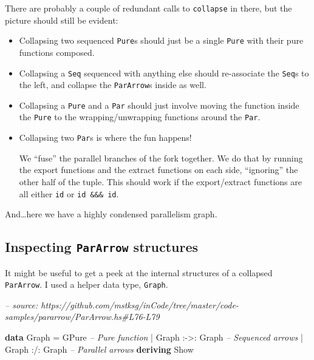 \documentclass[]{article}
\newenvironment{Shaded}{}{}
\newcommand{\CommentTok}[1]{\textcolor[rgb]{0.38,0.63,0.69}{\textit{#1}}}
\newcommand{\DataTypeTok}[1]{\textcolor[rgb]{0.56,0.13,0.00}{#1}}
\newcommand{\FunctionTok}[1]{\textcolor[rgb]{0.02,0.16,0.49}{#1}}
\newcommand{\KeywordTok}[1]{\textcolor[rgb]{0.00,0.44,0.13}{\textbf{#1}}}
\begin{document}
There are probably a couple of redundant calls to \texttt{collapse} in there,
but the picture should still be evident:

\begin{itemize}
\item
  Collapsing two sequenced \texttt{Pure}s should just be a single \texttt{Pure}
  with their pure functions composed.
\item
  Collapsing a \texttt{Seq} sequenced with anything else should re-associate the
  \texttt{Seq}s to the left, and collapse the \texttt{ParArrow}s inside as well.
\item
  Collapsing a \texttt{Pure} and a \texttt{Par} should just involve moving the
  function inside the \texttt{Pure} to the wrapping/unwrapping functions around
  the \texttt{Par}.
\item
  Collapsing two \texttt{Par}s is where the fun happens!

  We ``fuse'' the parallel branches of the fork together. We do that by running
  the export functions and the extract functions on each side, ``ignoring'' the
  other half of the tuple. This should work if the export/extract functions are
  all either \texttt{id} or \texttt{id\ \&\&\&\ id}.
\end{itemize}

And\ldots{}here we have a highly condensed parallelism graph.

\hypertarget{inspecting-pararrow-structures}{%
\subsection{\texorpdfstring{Inspecting \texttt{ParArrow}
structures}{Inspecting ParArrow structures}}\label{inspecting-pararrow-structures}}

It might be useful to get a peek at the internal structures of a collapsed
\texttt{ParArrow}. I used a helper data type, \texttt{Graph}.

\begin{Shaded}
\begin{Highlighting}[]
\CommentTok{-- source: https://github.com/mstksg/inCode/tree/master/code-samples/pararrow/ParArrow.hs#L76-L79}

\KeywordTok{data} \DataTypeTok{Graph} \FunctionTok{=} \DataTypeTok{GPure}                  \CommentTok{-- Pure function}
           \FunctionTok{|} \DataTypeTok{Graph} \FunctionTok{:->:} \DataTypeTok{Graph}       \CommentTok{-- Sequenced arrows}
           \FunctionTok{|} \DataTypeTok{Graph} \FunctionTok{:/:} \DataTypeTok{Graph}        \CommentTok{-- Parallel arrows}
           \KeywordTok{deriving} \DataTypeTok{Show}
\end{Highlighting}
\end{Shaded}
\end{document}
